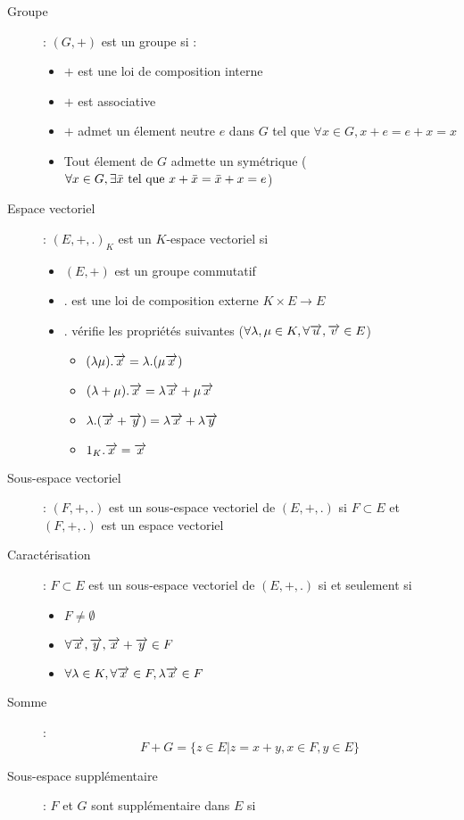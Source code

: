 \begin{description}
\item[Groupe] : $(G, +)$ est un groupe si :
\begin{itemize}
    \item $+$ est une loi de composition interne
    \item $+$ est associative
    \item $+$ admet un élement neutre $e$ dans $G$ tel que $\forall x\in G,x+e=e+x=x$
    \item Tout élement de $G$ admette un symétrique ($\forall x\in G, \exists\bar x\textrm{ tel que } x+\bar x=\bar x+x=e$)
\end{itemize}
\item[Espace vectoriel] : $(E,+,.)_K$ est un $K$-espace vectoriel si
\begin{itemize}
    \item $(E,+)$ est un groupe commutatif
    \item $.$ est une loi de composition externe $K\times E\rightarrow E$
    \item $.$ vérifie les propriétés suivantes ($\forall\lambda,\mu\in K, \forall\overrightarrow{u},\overrightarrow{v}\in E$)
    \begin{itemize}
        \item $(\lambda\mu).\overrightarrow{x}=\lambda.(\mu\overrightarrow{x})$
        \item $(\lambda+\mu).\overrightarrow{x}=\lambda\overrightarrow{x}+\mu\overrightarrow{x}$
        \item $\lambda.(\overrightarrow{x}+\overrightarrow{y})=\lambda\overrightarrow{x}+\lambda\overrightarrow{y}$
        \item $1_K.\overrightarrow{x}=\overrightarrow{x}$
    \end{itemize}
\end{itemize}
\item[Sous-espace vectoriel] : $(F,+,.)$ est un sous-espace vectoriel de $(E,+,.)$ si $F\subset E$
    et $(F,+,.)$ est un espace vectoriel
\item[Caractérisation] : $F\subset E$ est un sous-espace vectoriel de $(E,+,.)$ si et seulement si
\begin{itemize}
    \item $F\ne\emptyset$
    \item $\forall\overrightarrow{x},\overrightarrow{y}, \overrightarrow{x}+\overrightarrow{y}\in F$
    \item $\forall\lambda\in K,\forall\overrightarrow{x}\in F, \lambda\overrightarrow{x}\in F$
\end{itemize}
\item[Somme] :
    \[ F+G=\{z\in E|z=x+y, x\in F,y\in E\} \]
\item[Sous-espace supplémentaire] : $F$ et $G$ sont supplémentaire dans $E$ si

\end{description}
